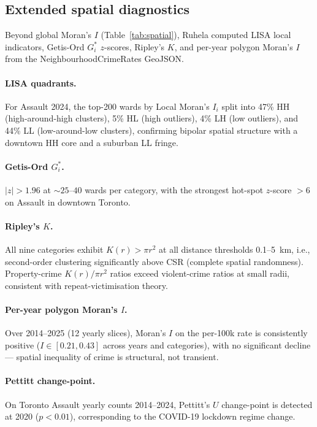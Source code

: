 \documentclass[11pt,a4paper]{article}
\newcommand{\1}{\mathbf{1}}
\theoremstyle{plain}
\theoremstyle{definition}
\begin{document}
\subsection{Extended spatial diagnostics}\label{sec:spatial-extended}

Beyond global Moran's $I$ (Table~\ref{tab:spatial}), Ruhela computed
LISA local indicators, Getis-Ord $G^\ast_i$ $z$-scores, Ripley's
$K$, and per-year polygon Moran's $I$ from the
NeighbourhoodCrimeRates GeoJSON.

\paragraph{LISA quadrants.}  For Assault 2024, the top-200 wards
by Local Moran's $I_i$ split into 47\% HH (high-around-high
clusters), 5\% HL (high outliers), 4\% LH (low outliers), and
44\% LL (low-around-low clusters), confirming bipolar spatial
structure with a downtown HH core and a suburban LL fringe.

\paragraph{Getis-Ord $G^\ast_i$.}  $|z|>1.96$ at $\sim 25$--$40$
wards per category, with the strongest hot-spot $z$-score $>6$
on Assault in downtown Toronto.

\paragraph{Ripley's $K$.}  All nine categories exhibit
$K(r)>\pi r^2$ at all distance thresholds 0.1--5~km, i.e.,
second-order clustering significantly above CSR (complete spatial
randomness).  Property-crime $K(r)/\pi r^2$ ratios exceed
violent-crime ratios at small radii, consistent with
repeat-victimisation theory.

\paragraph{Per-year polygon Moran's $I$.}  Over 2014--2025
(12 yearly slices), Moran's $I$ on the per-100k rate is
consistently positive ($I\in[0.21, 0.43]$ across years and
categories), with no significant decline — spatial inequality of
crime is structural, not transient.

\paragraph{Pettitt change-point.}  On Toronto Assault yearly counts
2014--2024, Pettitt's $U$ change-point is detected at 2020
($p<0.01$), corresponding to the COVID-19 lockdown regime change.
\end{document}
